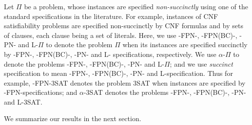 Let $\Pi$ be a problem, whose instances are specified {\em non-succinctly} 
using one of the standard specifications in the literature. For example,
instances of {\sf CNF} satisfiability problems  are specified non-succinctly
by {\sf CNF} formulas and by sets of clauses, each clause being a set of 
literals.
Here, we use {-FPN-}, {-FPN(BC)-}, {-PN-} and {\sf L-}$\Pi$ to
denote the problem $\Pi$ 
when its instances are specified succinctly by {-FPN-}, 
{-FPN(BC)-}, {-PN-} and {\sf L-} specifications, respectively. 
We use $\alpha$-$\Pi$ to denote the problems {-FPN-}, {-FPN(BC)-},
 {-PN-} and {\sf L-}$\Pi$; and we use {\em succinct} specification 
to mean {-FPN-}, {-FPN(BC)-}, {-PN-} and {\sf L-}specification. 
Thus for example, {-FPN-3SAT} denotes the problem {\sf 3SAT}
when instances are specified  by {-FPN-}specifications; and 
$\alpha$-{\sf 3SAT} denotes the problems {-FPN-}, {-FPN(BC)-}, 
{-PN-} and {\sf L-3SAT}.

We summarize our results in the next section.
